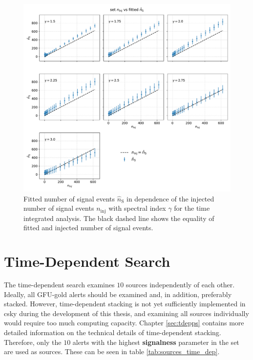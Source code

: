 \begin{figure}
    \centering
    \includegraphics[width=\linewidth]{Plots/05_csky/ns_fit_auto_4.pdf}
    \caption{Fitted number of signal events $\hat{n}_{\text{S}}$ in dependence of the injected number of signal events $n_\text{inj}$ with spectral index $\gamma$ for the time integrated analysis. The black dashed line shows the equality of fitted and injected number of signal events.}
    \label{fig:fit_bias_ns}
\end{figure}

\chapter{Time-Dependent Search} \label{sec:csky_time_dep}

The time-dependent search examines $\num{10}$ sources independently of each other.
Ideally, all GFU-gold alerts should be examined and, in addition, preferably stacked.
However, time-dependent stacking is not yet sufficiently implemented in csky during the development of this thesis, and examining all sources individually would require too much computing capacity.
Chapter \ref{sec:tdepps} contains more detailed information on the technical details of time-dependent stacking.
Therefore, only the $\num{10}$ alerts with the highest \textbf{signalness} parameter in the set are used as sources.
These can be seen in table \ref{tab:sources_time_dep}.

